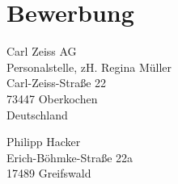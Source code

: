 \documentclass[11pt,a4paper]{moderncv}
\newcommand{\position}{%
    Wissenschaftlichen Mitarbeiters Algorithmenentwicklung und Datenanalyse in der optischen Messtechnik (m/w/x)}
\begin{document}
    \newpage
    \makeatletter
    \chapter{Bewerbung}{}

    \vspace*{1.0cm}
    \begin{minipage}{0.6\textwidth}
        \begin{flushleft}
            Carl Zeiss AG\\%
            Personalstelle, zH. Regina Müller\\%
            Carl-Zeiss-Straße 22\\%
            73447 Oberkochen\\%
            Deutschland
        \end{flushleft}
    \end{minipage}
    \hfill
    \begin{minipage}{0.3\textwidth}
        \begin{flushright}
            Philipp Hacker\\%
            Erich-Böhmke-Straße 22a\\%
            17489 Greifswald
        \end{flushright}
    \end{minipage}
\end{document}
